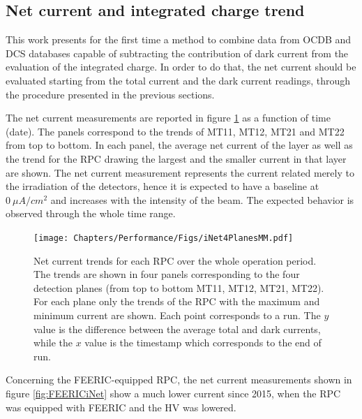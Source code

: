 \subsection{Net current and integrated charge trend}
This work presents for the first time a method to combine data from OCDB and DCS databases capable of subtracting the contribution of dark current from the evaluation of the integrated charge.
In order to do that, the net current should be evaluated starting from the total current and the dark current readings, through the procedure presented in the previous sections.

The net current measurements are reported in figure \ref{fig:iNet4Planes} as a function of time (date).
The panels correspond to the trends of MT11, MT12, MT21 and MT22 from top to bottom.
In each panel, the average net current of the layer as well as the trend for the RPC drawing the largest and the smaller current in that layer are shown.
The net current measurement represents the current related merely to the irradiation of the detectors, hence it is expected to have a baseline at $0\ \mu A/cm^2$ and increases with the intensity of the beam.
The expected behavior is observed through the whole time range.

\begin{figure}[!t]
\begin{center}
\texttt{[image: Chapters/Performance/Figs/iNet4PlanesMM.pdf]}
\caption{Net current trends for each RPC over the whole operation period. The trends are shown in four panels corresponding to the four detection planes (from top to bottom MT11, MT12, MT21, MT22). For each plane only the trends of the RPC with the maximum and minimum current are shown. Each point corresponds to a run. The $y$ value is the difference between the average total and dark currents, while the $x$ value is the timestamp which corresponds to the end of run.}
\label{fig:iNet4Planes}
\end{center}
\end{figure}

Concerning the FEERIC-equipped RPC, the net current measurements shown in figure \ref{fig:FEERICiNet} show a much lower current since 2015, when the RPC was equipped with FEERIC and the HV was lowered.

